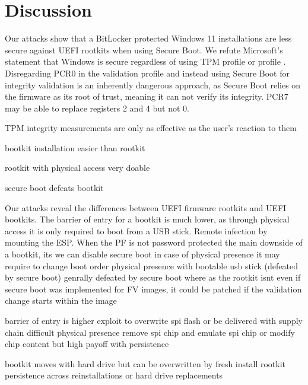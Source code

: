 


\chapter{Discussion}

Our attacks show that a BitLocker protected Windows 11 installations are less secure against \ac{UEFI} rootkits when using Secure Boot.
We refute Microsoft's statement that Windows is secure regardless of using \ac{TPM} profile  or profile  \cite{microsoft-pcr7-binding}.
Disregarding \ac{PCR}0 in the validation profile and instead using Secure Boot for integrity validation is an inherently dangerous approach, as Secure Boot relies on the firmware as its root of trust, meaning it can not verify its integrity.
\ac{PCR}7 may be able to replace registers 2 and 4 but not 0.

\ac{TPM} integrity measurements are only as effective as the user's reaction to them

bootkit installation easier than rootkit

rootkit with physical access very doable

secure boot defeats bootkit


Our attacks reveal the differences between \ac{UEFI} firmware rootkits and \ac{UEFI} bootkits.
The barrier of entry for a bootkit is much lower, as through physical access it is only required to boot from a \ac{USB} stick.
Remote infection by mounting the \ac{ESP}.
When the \ac{PF} is not password protected the main downside of a bootkit, its  we can disable secure boot
in case of physical presence it may require to change boot order
physical presence with bootable usb stick (defeated by secure boot)
genrally defeated by secure boot where as the rootkit isnt
even if secure boot was implemented for FV images, it could be patched if the validation change starts within the image

barrier of entry is higher
exploit to overwrite spi flash or be delivered with supply chain difficult
physical presence remove spi chip and emulate spi chip or modify chip content
but high payoff with persistence

bootkit moves with hard drive but can be overwritten by fresh install
rootkit persistence across reinstallations or hard drive replacements


